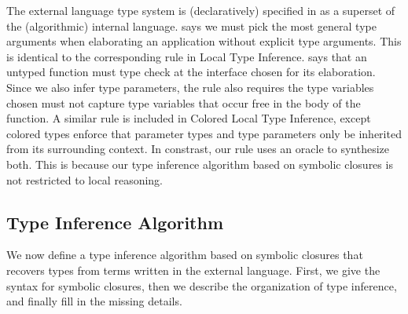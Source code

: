 The external language type system is (declaratively) specified in
as a superset of the (algorithmic) internal language.
\ltiEAppInf says we must pick the most general type arguments when elaborating
an application without explicit type arguments.
This is identical to the corresponding rule in Local Type Inference.
\ltiEUAbs says that an untyped function must type check at the interface
chosen for its elaboration.
Since we also infer type parameters, the rule also requires the type variables chosen must
not capture type variables that occur free in the body of the function.
A similar rule is included in Colored Local Type Inference, except
colored types enforce that parameter types and type parameters only be inherited
from its surrounding context.
In constrast, our rule uses an oracle to synthesize both.
This is because our type inference algorithm based on symbolic closures
is not restricted to local reasoning.

\subsection{Type Inference Algorithm}

We now define a type inference algorithm based on symbolic closures
that recovers types from terms written in the external language.
First, we give the syntax for symbolic closures, then we describe
the organization of type inference, and finally fill in the missing details.

